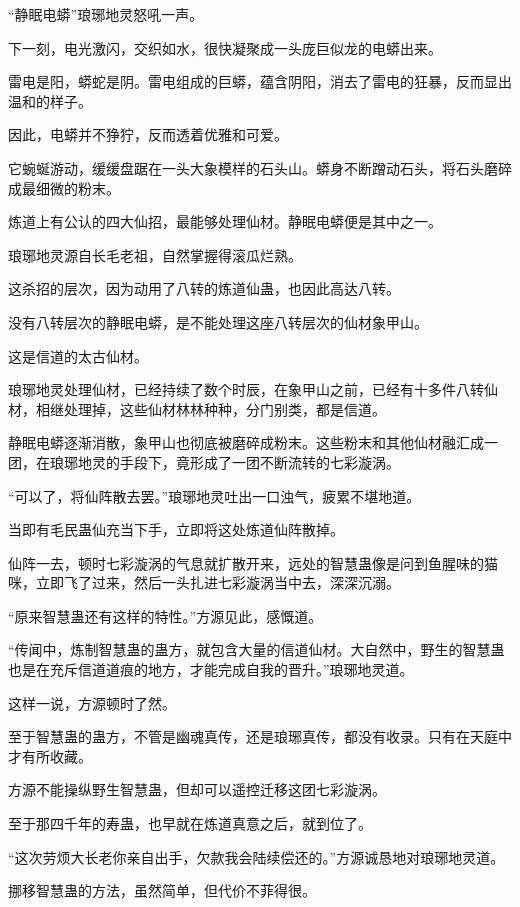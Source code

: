 
\begin{this_body}

“静眠电蟒”琅琊地灵怒吼一声。

下一刻，电光激闪，交织如水，很快凝聚成一头庞巨似龙的电蟒出来。

雷电是阳，蟒蛇是阴。雷电组成的巨蟒，蕴含阴阳，消去了雷电的狂暴，反而显出温和的样子。

因此，电蟒并不狰狞，反而透着优雅和可爱。

它蜿蜒游动，缓缓盘踞在一头大象模样的石头山。蟒身不断蹭动石头，将石头磨碎成最细微的粉末。

炼道上有公认的四大仙招，最能够处理仙材。静眠电蟒便是其中之一。

琅琊地灵源自长毛老祖，自然掌握得滚瓜烂熟。

这杀招的层次，因为动用了八转的炼道仙蛊，也因此高达八转。

没有八转层次的静眠电蟒，是不能处理这座八转层次的仙材象甲山。

这是信道的太古仙材。

琅琊地灵处理仙材，已经持续了数个时辰，在象甲山之前，已经有十多件八转仙材，相继处理掉，这些仙材林林种种，分门别类，都是信道。

静眠电蟒逐渐消散，象甲山也彻底被磨碎成粉末。这些粉末和其他仙材融汇成一团，在琅琊地灵的手段下，竟形成了一团不断流转的七彩漩涡。

“可以了，将仙阵散去罢。”琅琊地灵吐出一口浊气，疲累不堪地道。

当即有毛民蛊仙充当下手，立即将这处炼道仙阵散掉。

仙阵一去，顿时七彩漩涡的气息就扩散开来，远处的智慧蛊像是问到鱼腥味的猫咪，立即飞了过来，然后一头扎进七彩漩涡当中去，深深沉溺。

“原来智慧蛊还有这样的特性。”方源见此，感慨道。

“传闻中，炼制智慧蛊的蛊方，就包含大量的信道仙材。大自然中，野生的智慧蛊也是在充斥信道道痕的地方，才能完成自我的晋升。”琅琊地灵道。

这样一说，方源顿时了然。

至于智慧蛊的蛊方，不管是幽魂真传，还是琅琊真传，都没有收录。只有在天庭中才有所收藏。

方源不能操纵野生智慧蛊，但却可以遥控迁移这团七彩漩涡。

至于那四千年的寿蛊，也早就在炼道真意之后，就到位了。

“这次劳烦大长老你亲自出手，欠款我会陆续偿还的。”方源诚恳地对琅琊地灵道。

挪移智慧蛊的方法，虽然简单，但代价不菲得很。


\end{this_body}
